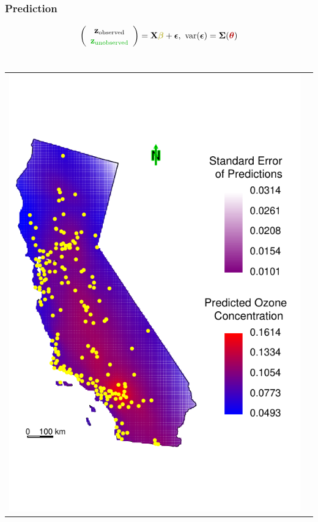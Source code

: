 \documentclass[mathserif,compress]{beamer}\usepackage{graphicx, color}
\makeatletter
\def\maxwidth{ %
  \ifdim\Gin@nat@width>\linewidth
    \linewidth
  \else
    \Gin@nat@width
  \fi
}
\def\bz{\mathbf{z}}
\def\bX{\mathbf{X}}
\def\bbeta{\mbox{\boldmath $\beta$}}
\def\bepsilon{\mbox{\boldmath $\epsilon$}}
\def\btheta{\mbox{\boldmath $\theta$}}
\def\bSigma{\mbox{\boldmath $\Sigma$}}
\def\var{\textrm{var}}
\makeatother
\begin{document}
\subsection{}
\begin{frame}[fragile]
\frametitle{Prediction}

		 \[
			\left(\begin{array}{c}	
					\bz_{\textrm{observed}} \\
					{\color{green!70!black} \bz_{\textrm{unobserved}}}
			\end{array} \right) =  \bX{\color{yellow!70!black}\bbeta} + 
			\bepsilon, \ \var(\bepsilon) = \bSigma({\color{red!70!black}\btheta}) \] \\





	\begin{tabular} {p{4.5cm} p{4.5cm}}
		\vspace{-.8cm}
		{\centering \includegraphics[width=.9\maxwidth]{figure/CA-predMap} } &

\end{tabular}
\end{frame}
\end{document}
